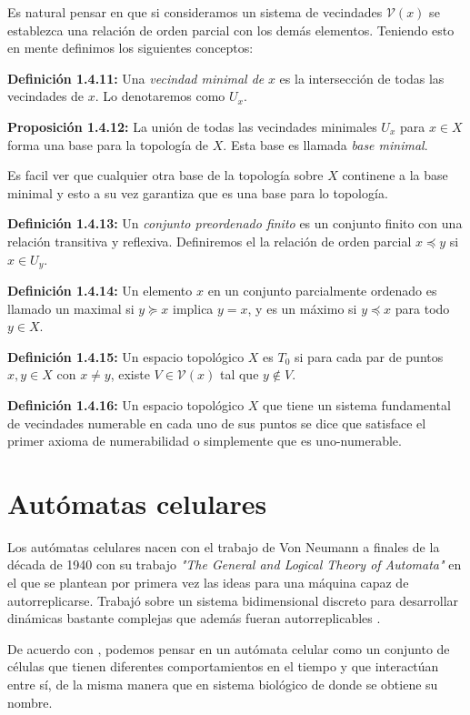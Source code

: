Es natural pensar en que si consideramos un sistema de vecindades $\mathcal{V}(x)$ se establezca una relación de orden parcial con los demás elementos. Teniendo esto en mente definimos los siguientes conceptos:

\textbf{Definición 1.4.11:} Una \textit{vecindad minimal de} $x$ es la intersección de todas las vecindades de $x$. Lo denotaremos como $U_x$.

\textbf{Proposición 1.4.12:} La unión de todas las vecindades minimales $U_x$ para $x\in X$ forma una base para la topología de $X$. Esta base es llamada \textit{base minimal}.

Es facil ver que cualquier otra base de la topología sobre $X$ continene a la base minimal y esto a su vez garantiza que es una base para lo topología.

\textbf{Definición 1.4.13:} Un \textit{conjunto preordenado finito} es un conjunto finito con una relación transitiva y reflexiva. Definiremos el la relación de orden parcial $x\preceq y$ si $x\in U_y$.

\textbf{Definición 1.4.14:} Un elemento $x$ en un conjunto parcialmente ordenado es llamado un maximal si $y\succeq x$ implica $y=x$, y es un máximo si $y\preceq x$ para todo $y\in X$.

\textbf{Definición 1.4.15:} Un espacio topológico $X$ es $T_0$ si para cada par de puntos $x,y\in X$ con $x\neq y$, existe $V\in\mathcal{V}(x)$ tal que $y\notin V$.

\textbf{Definición 1.4.16:} Un espacio topológico $X$ que tiene un sistema fundamental de vecindades numerable en cada uno de sus puntos se dice que satisface el primer axioma de numerabilidad o simplemente que es uno-numerable.

\section{Autómatas celulares}\label{sec:Autómatas celulares}

Los autómatas celulares nacen con el trabajo de Von Neumann a finales de la década de 1940 con su trabajo \textit{"The General and Logical Theory of Automata"} en el que se plantean por primera vez las ideas para una máquina capaz de autorreplicarse. Trabajó sobre un sistema bidimensional discreto para desarrollar dinámicas bastante complejas que además fueran autorreplicables \cite{alfons2010,ACaplicacionesComputacion}.

De acuerdo con \cite{descripcionyAplicaciones}, podemos pensar en un autómata celular como un conjunto de células que tienen diferentes comportamientos en el tiempo y que interactúan entre sí, de la misma manera que en sistema biológico de donde se obtiene su nombre.

